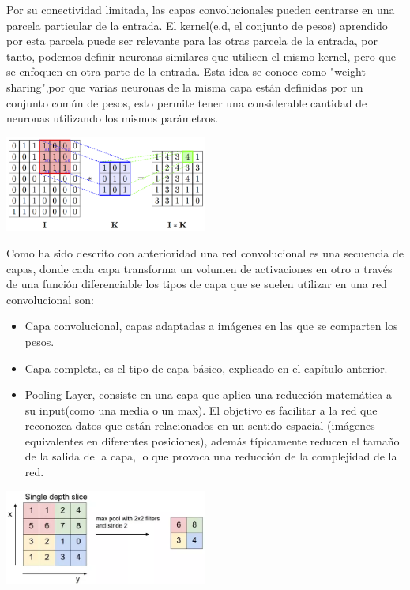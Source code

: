 \documentclass[12,twoside]{TFG-GM}
\theoremstyle{definition}
\theoremstyle{remark}
\begin{document}
Por su conectividad limitada, las capas convolucionales pueden centrarse en una parcela particular de la entrada. El kernel(e.d, el conjunto de pesos) aprendido por esta parcela puede ser relevante para las otras parcela de la entrada, por tanto, podemos definir neuronas similares que utilicen el mismo kernel, pero que se enfoquen en otra parte de la entrada. Esta idea se conoce como "weight sharing",por que varias neuronas de la misma capa están definidas por un conjunto común de pesos, esto permite tener una considerable cantidad de neuronas utilizando los mismos parámetros. 

\begin{center}
\includegraphics[width = 0.5\textwidth]{Images/convolve.png} 
\end{center}

Como ha sido descrito con anterioridad una red convolucional es una secuencia de capas, donde cada capa transforma un volumen de activaciones en otro a través de una función diferenciable los tipos de capa que se suelen utilizar en una red convolucional son: 
\begin{itemize}
\item Capa convolucional, capas adaptadas a imágenes en las que se comparten los pesos.
\item Capa completa, es el tipo de capa básico, explicado en el capítulo anterior. 
\item Pooling Layer, consiste en una capa que aplica una reducción matemática a su input(como una media o un max). El objetivo es facilitar a la red que reconozca datos que están relacionados en un sentido espacial (imágenes equivalentes en diferentes posiciones), además típicamente reducen el tamaño de la salida de la capa, lo que provoca una reducción de la complejidad de la red.
\end{itemize}

\begin{center}
\includegraphics[width = 0.5\textwidth]{Images/pooling1.png} 
\end{center}
\end{document}
